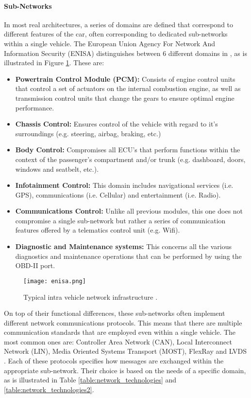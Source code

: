 \paragraph{Sub-Networks}
In most real architectures, a series of domains are defined that correspond to different features of the car, often corresponding to dedicated sub-networks within a single vehicle. The European Union Agency For Network And Information Security (ENISA) distinguishes between 6 different domains in \cite{Enisa}, as is illustrated in Figure \ref{fig:enisa}. These are:
\begin{itemize}
	\item \textbf{Powertrain Control Module (PCM):} Consists of engine control units that control a set of actuators on the internal combustion engine, as well as transmission control units that change the gears to ensure optimal engine performance. 
	
	\item \textbf{Chassis Control:} Ensures control of the vehicle with regard to it's surroundings (e.g. steering, airbag, braking, etc.)
	
	\item \textbf{Body Control:} Compromises all ECU's that perform functions within the context of the passenger's compartment and/or trunk (e.g. dashboard, doors, windows and seatbelt, etc.).
	
	\item \textbf{Infotainment Control:} This domain includes navigational services (i.e. GPS), communications (i.e. Cellular) and entertainment (i.e. Radio).
	
	\item \textbf{Communications Control:} Unlike all previous modules, this one does not compromise a single sub-network but rather a series of communication features offered by a telematics control unit (e.g. Wifi).
	
	\item \textbf{Diagnostic and Maintenance systems:} This concerns all the various diagnostics and maintenance operations that can be performed by using the OBD-II port.
\end{itemize}
\begin{figure}[h]
	\centering
	\texttt{[image: enisa.png]}
	\caption{Typical intra vehicle network infrastructure \cite{Enisa}.}
    \label{fig:enisa}
\end{figure}
On top of their functional differences, these sub-networks often implement different network communications protocols. This means that there are multiple communication standards that are employed even within a single vehicle. The most common ones are: Controller Area Network (CAN), Local Interconnect Network (LIN), Media Oriented Systems Transport (MOST), FlexRay and LVDS \cite{Tuhoy}. Each of these protocols specifies how messages are exchanged within the appropriate sub-network. Their choice is based on the needs of a specific domain, as is illustrated in Table \ref{table:network_technologies} and \ref{table:network_technologies2}.
